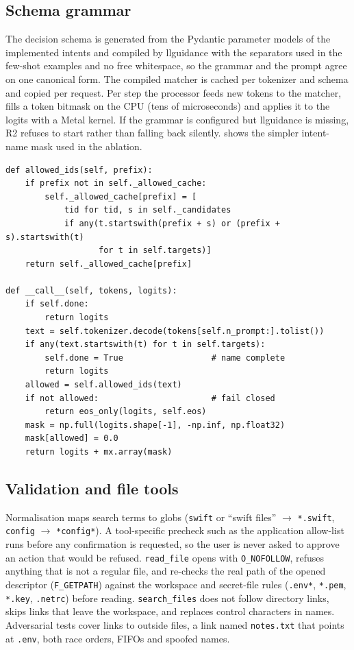 \documentclass[10pt,twocolumn,letterpaper]{article}
\theoremstyle{definition}
\begin{document}
\subsection{Schema grammar}
The decision schema is generated from the Pydantic parameter models of the implemented intents and
compiled by llguidance with the separators used in the few-shot examples and no free whitespace, so
the grammar and the prompt agree on one canonical form. The compiled matcher is cached per tokenizer
and schema and copied per request. Per step the processor feeds new tokens to the matcher, fills a
token bitmask on the CPU (tens of microseconds) and applies it to the logits with a Metal kernel. If
the grammar is configured but llguidance is missing, R2 refuses to start rather than falling back
silently.  shows the simpler intent-name mask used in the ablation.

\begin{lstlisting}[caption={Intent-name mask (abridged from \texttt{models/constrained.py}).},label={lst:mask},float=t]
def allowed_ids(self, prefix):
    if prefix not in self._allowed_cache:
        self._allowed_cache[prefix] = [
            tid for tid, s in self._candidates
            if any(t.startswith(prefix + s) or (prefix + s).startswith(t)
                   for t in self.targets)]
    return self._allowed_cache[prefix]

def __call__(self, tokens, logits):
    if self.done:
        return logits
    text = self.tokenizer.decode(tokens[self.n_prompt:].tolist())
    if any(text.startswith(t) for t in self.targets):
        self.done = True                  # name complete
        return logits
    allowed = self.allowed_ids(text)
    if not allowed:                       # fail closed
        return eos_only(logits, self.eos)
    mask = np.full(logits.shape[-1], -np.inf, np.float32)
    mask[allowed] = 0.0
    return logits + mx.array(mask)
\end{lstlisting}

\subsection{Validation and file tools}
Normalisation maps search terms to globs (\texttt{swift} or ``swift files'' $\to$ \texttt{*.swift},
\texttt{config} $\to$ \texttt{*config*}). A tool-specific precheck such as the application
allow-list runs before any confirmation is requested, so the user is never asked to approve an action
that would be refused. \texttt{read\_file} opens with \texttt{O\_NOFOLLOW}, refuses anything that is
not a regular file, and re-checks the real path of the opened descriptor (\texttt{F\_GETPATH})
against the workspace and secret-file rules (\texttt{.env*}, \texttt{*.pem}, \texttt{*.key},
\texttt{.netrc}) before reading. \texttt{search\_files} does not follow directory links, skips links
that leave the workspace, and replaces control characters in names. Adversarial tests cover links to
outside files, a link named \texttt{notes.txt} that points at \texttt{.env}, both race orders, FIFOs
and spoofed names.
\end{document}

